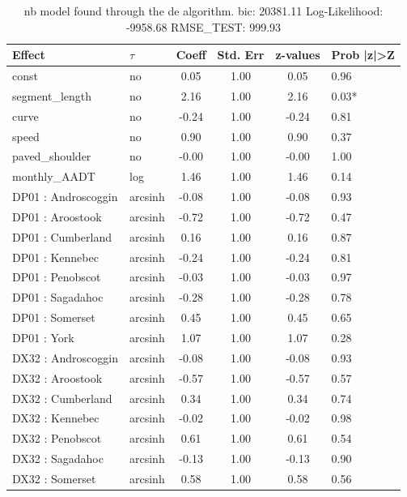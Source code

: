 \begin{table}
	\caption{nb model found through the de algorithm. bic: 20381.11 Log-Likelihood: -9958.68 RMSE_TEST: 999.93}
	\begin{center}
		\begin{tabular}{|l|l|c|c|c|l|}
			\hline
			Effect & $\tau$ & Coeff & Std. Err & z-values & Prob |z|>Z \\
			\hline
			const & no & 0.05 & 1.00 & 0.05 & 0.96 \\
			\hline
			segment_length & no & 2.16 & 1.00 & 2.16 & 0.03* \\
			\hline
			curve & no & -0.24 & 1.00 & -0.24 & 0.81 \\
			\hline
			speed & no & 0.90 & 1.00 & 0.90 & 0.37 \\
			\hline
			paved_shoulder & no & -0.00 & 1.00 & -0.00 & 1.00 \\
			\hline
			monthly_AADT & log & 1.46 & 1.00 & 1.46 & 0.14 \\
			\hline
			DP01 : Androscoggin & arcsinh & -0.08 & 1.00 & -0.08 & 0.93 \\
			\hline
			DP01 : Aroostook & arcsinh & -0.72 & 1.00 & -0.72 & 0.47 \\
			\hline
			DP01 : Cumberland & arcsinh & 0.16 & 1.00 & 0.16 & 0.87 \\
			\hline
			DP01 : Kennebec & arcsinh & -0.24 & 1.00 & -0.24 & 0.81 \\
			\hline
			DP01 : Penobscot & arcsinh & -0.03 & 1.00 & -0.03 & 0.97 \\
			\hline
			DP01 : Sagadahoc & arcsinh & -0.28 & 1.00 & -0.28 & 0.78 \\
			\hline
			DP01 : Somerset & arcsinh & 0.45 & 1.00 & 0.45 & 0.65 \\
			\hline
			DP01 : York & arcsinh & 1.07 & 1.00 & 1.07 & 0.28 \\
			\hline
			DX32 : Androscoggin & arcsinh & -0.08 & 1.00 & -0.08 & 0.93 \\
			\hline
			DX32 : Aroostook & arcsinh & -0.57 & 1.00 & -0.57 & 0.57 \\
			\hline
			DX32 : Cumberland & arcsinh & 0.34 & 1.00 & 0.34 & 0.74 \\
			\hline
			DX32 : Kennebec & arcsinh & -0.02 & 1.00 & -0.02 & 0.98 \\
			\hline
			DX32 : Penobscot & arcsinh & 0.61 & 1.00 & 0.61 & 0.54 \\
			\hline
			DX32 : Sagadahoc & arcsinh & -0.13 & 1.00 & -0.13 & 0.90 \\
			\hline
			DX32 : Somerset & arcsinh & 0.58 & 1.00 & 0.58 & 0.56 \\

\end{tabular}
\end{center}
\end{table}
